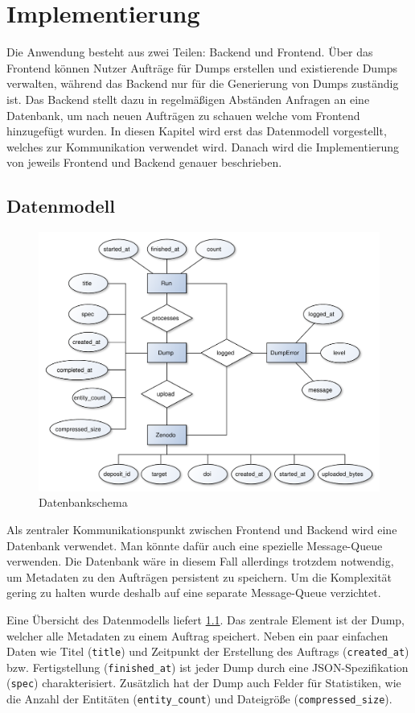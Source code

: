\chapter{Implementierung}
\label{chap:implementation}

Die Anwendung besteht aus zwei Teilen: Backend und Frontend. Über das Frontend können Nutzer Aufträge für Dumps erstellen und existierende Dumps verwalten, während das Backend nur für die Generierung von Dumps zuständig ist.
Das Backend stellt dazu in regelmäßigen Abständen Anfragen an eine Datenbank, um nach neuen Aufträgen zu schauen welche vom Frontend hinzugefügt wurden.
In diesen Kapitel wird erst das Datenmodell vorgestellt, welches zur Kommunikation verwendet wird.
Danach wird die Implementierung von jeweils Frontend und Backend genauer beschrieben.

\section{Datenmodell}
\begin{figure}
  \includegraphics[width=\textwidth]{pics/db-er}
  \caption{Datenbankschema}
  \label{fig:db-er}
\end{figure}
Als zentraler Kommunikationspunkt zwischen Frontend und Backend wird eine Datenbank verwendet.
Man könnte dafür auch eine spezielle Message-Queue verwenden.
Die Datenbank wäre in diesem Fall allerdings trotzdem notwendig, um Metadaten zu den Aufträgen persistent zu speichern.
Um die Komplexität gering zu halten wurde deshalb auf eine separate Message-Queue verzichtet.

Eine Übersicht des Datenmodells liefert \cref{fig:db-er}.
Das zentrale Element ist der Dump, welcher alle Metadaten zu einem Auftrag speichert.
Neben ein paar einfachen Daten wie Titel (\verb|title|) und Zeitpunkt der Erstellung des Auftrags (\verb|created_at|) bzw. Fertigstellung (\verb|finished_at|) ist jeder Dump durch eine JSON-Spezifikation (\verb|spec|) charakterisiert. Zusätzlich hat der Dump auch Felder für Statistiken, wie die Anzahl der Entitäten (\verb|entity_count|) und Dateigröße (\verb|compressed_size|).

